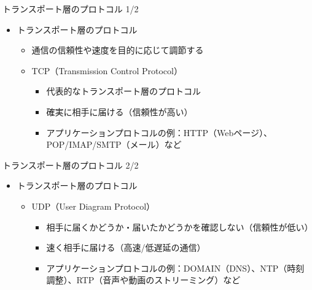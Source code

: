 \documentclass[12pt,aspectratio=169]{beamer}
\begin{document}
\begin{frame}{トランスポート層のプロトコル 1/2}

  \begin{itemize}
    \item トランスポート層のプロトコル
      \begin{itemize}
        \item 通信の信頼性や速度を目的に応じて調節する
        \item TCP（Transmission Control Protocol）
          \begin{itemize}
            \item 代表的なトランスポート層のプロトコル
            \item 確実に相手に届ける（信頼性が高い）
            \item アプリケーションプロトコルの例：HTTP（Webページ）、POP/IMAP/SMTP（メール）など
          \end{itemize}

      \end{itemize}
  \end{itemize}

\end{frame}


\begin{frame}{トランスポート層のプロトコル 2/2}

  \begin{itemize}
    \item トランスポート層のプロトコル
      \begin{itemize}
        \item UDP（User Diagram Protocol）
          \begin{itemize}
            \item 相手に届くかどうか・届いたかどうかを確認しない（信頼性が低い）
            \item 速く相手に届ける（高速/低遅延の通信）
            \item アプリケーションプロトコルの例：DOMAIN（DNS）、NTP（時刻調整）、RTP（音声や動画のストリーミング）など
          \end{itemize}

      \end{itemize}
  \end{itemize}

\end{frame}
\end{document}
